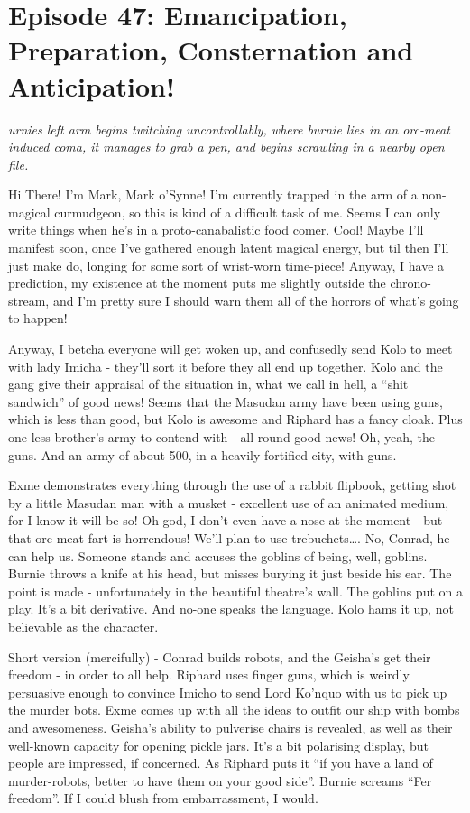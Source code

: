\section{Episode 47: Emancipation, Preparation, Consternation and Anticipation!}

\medskip

\textit{urnies left arm begins twitching uncontrollably, where burnie lies in an orc-meat induced coma, it manages to grab a pen, and begins scrawling in a nearby open file.} \medskip

Hi There! I’m Mark, Mark o’Synne! I’m currently trapped in the arm of a non-magical curmudgeon, so this is kind of a difficult task of me. Seems I can only write things when he’s in a proto-canabalistic food comer. Cool! Maybe I’ll manifest soon, once I’ve gathered enough latent magical energy, but til then I’ll just make do, longing for some sort of wrist-worn time-piece! Anyway, I have a prediction, my existence at the moment puts me slightly outside the chrono-stream, and I’m pretty sure I should warn them all of the horrors of what’s going to happen!\medskip

Anyway, I betcha everyone will get woken up, and confusedly send Kolo to meet with lady Imicha - they’ll sort it before they all end up together. Kolo and the gang give their appraisal of the situation in, what we call in hell, a “shit sandwich” of good news! Seems that the Masudan army have been using guns, which is less than good, but Kolo is awesome and Riphard has a fancy cloak. Plus one less brother’s army to contend with - all round good news! Oh, yeah, the guns. And an army of about 500, in a heavily fortified city, with guns.\medskip

Exme demonstrates everything through the use of a rabbit flipbook, getting shot by a little Masudan man with a musket - excellent use of an animated medium, for I know it will be so! Oh god, I don’t even have a nose at the moment - but that orc-meat fart is horrendous! We’ll plan to use trebuchets…. No, Conrad, he can help us. Someone stands and accuses the goblins of being, well, goblins. Burnie throws a knife at his head, but misses burying it just beside his ear. The point is made - unfortunately in the beautiful theatre’s wall. The goblins put on a play. It’s a bit derivative. And no-one speaks the language. Kolo hams it up, not believable as the character.\medskip

Short version (mercifully) - Conrad builds robots, and the Geisha’s get their freedom - in order to all help. Riphard uses finger guns, which is weirdly persuasive enough to convince Imicho to send Lord Ko’nquo with us to pick up the murder bots. Exme comes up with all the ideas to outfit our ship with bombs and awesomeness. Geisha’s ability to pulverise chairs is revealed, as well as their well-known capacity for opening pickle jars. It’s a bit polarising display, but people are impressed, if concerned. As Riphard puts it “if you have a land of murder-robots, better to have them on your good side”. Burnie screams “Fer freedom”. If I could blush from embarrassment, I would.\medskip

